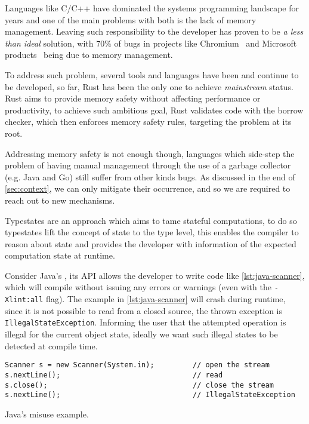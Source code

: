 Languages like C/C++ have dominated the systems programming landscape for years and
one of the main problems with both is the lack of memory management.
Leaving such responsibility to the developer has proven to be \emph{a less than ideal}
solution, with $70\%$ of bugs in projects like Chromium~\autocite{chromium}
and Microsoft products~\autocite{Miller2019} being due to memory management.

To address such problem, several tools and languages have been and continue to be developed,
so far, Rust has been the only one to achieve \emph{mainstream} status.
Rust aims to provide memory safety without affecting performance or productivity,
to achieve such ambitious goal, Rust validates code with the borrow checker, which then enforces memory safety rules,
targeting the problem at its root.

Addressing memory safety is not enough though,
languages which side-step the problem of having manual management
through the use of a garbage collector (e.g. Java and Go) still suffer from other kinds bugs.
As discussed in the end of \autoref{sec:context}, we can only mitigate their occurrence, and
so we are required to reach out to new mechanisms.

Typestates are an approach which aims to tame stateful computations,
to do so typestates lift the concept of state to the type level,
this enables the compiler to reason about state and provides the developer
with information of the expected computation state at runtime.

Consider Java's , its API allows the developer to write code like \autoref{lst:java-scanner},
which will compile without issuing any errors or warnings (even with the \texttt{-Xlint:all} flag).
The example in \autoref{lst:java-scanner} will crash during runtime, since it is not possible to read from a closed source,
the thrown exception is \texttt{IllegalStateException}.
Informing the user that the attempted operation is illegal for the current object state,
ideally we want such illegal states to be detected at compile time.

\begin{listing}
    \begin{verbatim}
Scanner s = new Scanner(System.in);         // open the stream
s.nextLine();                               // read
s.close();                                  // close the stream
s.nextLine();                               // IllegalStateException
    \end{verbatim}
    \caption{Java's  misuse example.}
    \label{lst:java-scanner}
\end{listing}

